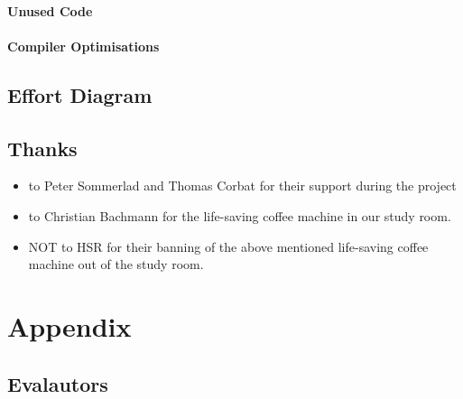 \documentclass[12pt,halfparskip,DIV11,BCOR10mm]{scrreprt}
\begin{document}
\subsubsection{Unused Code}
\subsubsection{Compiler Optimisations}

\clearpage

\section{Effort Diagram}

\clearpage

\section{Thanks}

\begin{itemize}
	\item to Peter Sommerlad and Thomas Corbat for their support during the project
	\item to Christian Bachmann for the life-saving coffee machine in our study room. 
	\item NOT to HSR for their banning of the above mentioned life-saving coffee machine out of the study room.
\end{itemize}



\setcounter{secnumdepth}{-1}
\chapter{Appendix}

\section{Evalautors}
\end{document}
